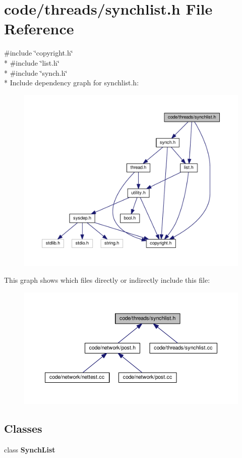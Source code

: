 \section{code/threads/synchlist.h File Reference}
\label{synchlist_8h}
{\ttfamily \#include \char`\"{}copyright.\+h\char`\"{}}\\*
{\ttfamily \#include \char`\"{}list.\+h\char`\"{}}\\*
{\ttfamily \#include \char`\"{}synch.\+h\char`\"{}}\\*
Include dependency graph for synchlist.\+h\+:
\nopagebreak
\begin{figure}[H]
\begin{center}
\leavevmode
\includegraphics[width=350pt]{synchlist_8h__incl}
\end{center}
\end{figure}
This graph shows which files directly or indirectly include this file\+:
\nopagebreak
\begin{figure}[H]
\begin{center}
\leavevmode
\includegraphics[width=350pt]{synchlist_8h__dep__incl}
\end{center}
\end{figure}
\subsection*{Classes}
\begin{DoxyCompactItemize}
\item 
class {\bf Synch\+List}
\end{DoxyCompactItemize}
